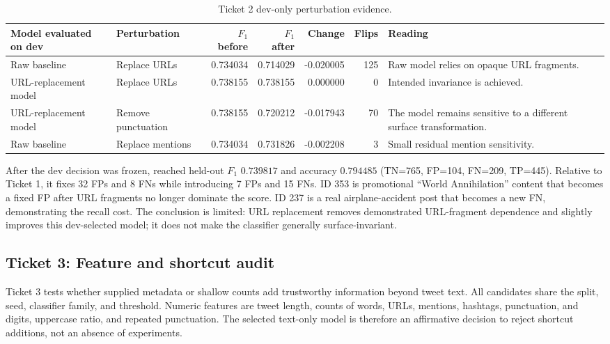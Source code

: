 \documentclass[10pt]{article}
\newcommand{\code}[1]{\texttt{\detokenize{#1}}}
\newcommand{\fscore}{\ensuremath{F_1}}
\begin{document}
\begin{table}[htbp]
\centering
\scriptsize
\begin{tabularx}{\textwidth}{Y Y r r r r Y}
\toprule
Model evaluated on dev & Perturbation & \fscore{} before & \fscore{} after & Change & Flips & Reading \\
\midrule
Raw baseline & Replace URLs & 0.734034 & 0.714029 & -0.020005 & 125 & Raw model relies on opaque URL fragments. \\
URL-replacement model & Replace URLs & 0.738155 & 0.738155 & 0.000000 & 0 & Intended invariance is achieved. \\
URL-replacement model & Remove punctuation & 0.738155 & 0.720212 & -0.017943 & 70 & The model remains sensitive to a different surface transformation. \\
Raw baseline & Replace mentions & 0.734034 & 0.731826 & -0.002208 & 3 & Small residual mention sensitivity. \\
\bottomrule
\end{tabularx}
\caption{Ticket 2 dev-only perturbation evidence.}
\label{tab:ticket2-stress}
\end{table}

After the dev decision was frozen, \code{url_replace} reached held-out \fscore{} $0.739817$ and accuracy $0.794485$ (TN=765, FP=104, FN=209, TP=445). Relative to Ticket 1, it fixes 32 FPs and 8 FNs while introducing 7 FPs and 15 FNs. ID 353 is promotional ``World Annihilation'' content that becomes a fixed FP after URL fragments no longer dominate the score. ID 237 is a real airplane-accident post that becomes a new FN, demonstrating the recall cost. The conclusion is limited: URL replacement removes demonstrated URL-fragment dependence and slightly improves this dev-selected model; it does not make the classifier generally surface-invariant.

\subsection{Ticket 3: Feature and shortcut audit}

Ticket 3 tests whether supplied metadata or shallow counts add trustworthy information beyond tweet text. All candidates share the split, seed, classifier family, and threshold. Numeric features are tweet length, counts of words, URLs, mentions, hashtags, punctuation, and digits, uppercase ratio, and repeated punctuation. The selected text-only model is therefore an affirmative decision to reject shortcut additions, not an absence of experiments.
\end{document}

